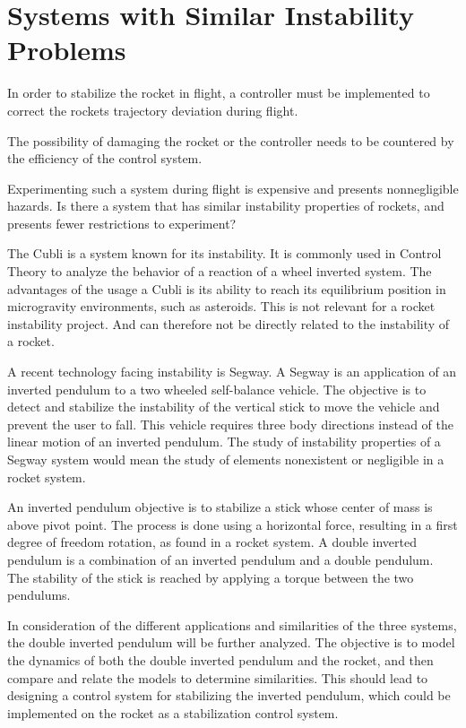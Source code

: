 \section{Systems with Similar Instability Problems}
\graphicspath{{figures/"Preanalysis&Requirement"/SimilarSystems/}}

In order to stabilize the rocket in flight, a controller must be implemented to correct the rockets trajectory deviation during flight.

The possibility of damaging the rocket or the controller needs to be countered by the efficiency of the control system.


Experimenting such a system during flight is expensive and presents nonnegligible hazards.
Is there a system that has similar instability properties of rockets, and presents fewer restrictions to experiment?

The Cubli is a system known for its instability. It is commonly used in Control Theory to analyze the behavior of a reaction of a wheel inverted system. The advantages of the usage a Cubli is its ability to reach its equilibrium position in microgravity environments, such as asteroids. This is not relevant for a rocket instability project. And can therefore not be directly related to the instability of a rocket.

A recent technology facing instability is Segway. A Segway is an application of an inverted pendulum to a two wheeled self-balance vehicle. The objective is to detect and stabilize the instability of the vertical stick to move the vehicle and prevent the user to fall. This vehicle requires three body directions instead of the linear motion of an inverted pendulum. The study of instability properties of a Segway system would mean the study of elements nonexistent or negligible in a rocket system.

An inverted pendulum objective is to stabilize a stick whose center of mass is above pivot point. The process is done using a horizontal force, resulting in a first degree of freedom rotation, as found in a rocket system. A double inverted pendulum is a combination of an inverted pendulum and a double pendulum. The stability of the stick is reached by applying a torque between the two pendulums.

In consideration of the different applications and similarities of the three systems, the double inverted pendulum will be further analyzed. The objective is to model the dynamics of both the double inverted pendulum and the rocket, and then compare and relate the models to determine similarities. This should lead to designing a control system for stabilizing the inverted pendulum, which could be implemented on the rocket as a stabilization control system. 



